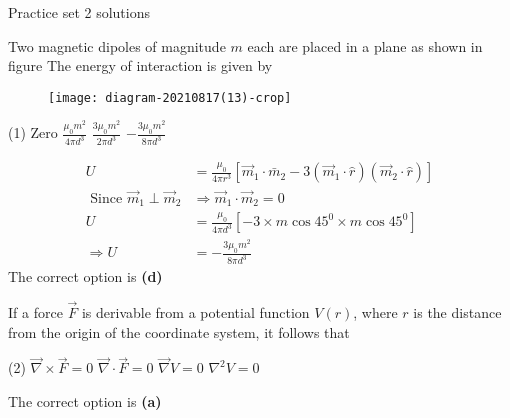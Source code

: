 \newpage
\begin{abox}
	Practice set 2 solutions
	\end{abox}
\begin{enumerate}
	\begin{minipage}{\textwidth}
		\item Two magnetic dipoles of magnitude $m$ each are placed in a plane as shown in figure The energy of interaction is given by
		\begin{figure}[H]
			\centering
			\texttt{[image: diagram-20210817(13)-crop]}
			\caption{}
			\label{}
		\end{figure}
	\end{minipage}
	\begin{tasks}(1)
		\task[\textbf{A.}] Zero
		\task[\textbf{B.}]$\frac{\mu_{0} m^{2}}{4 \pi d^{3}}$
		\task[\textbf{C.}]$\frac{3 \mu_{0} m^{2}}{2 \pi d^{3}}$
		\task[\textbf{D.}]$-\frac{3 \mu_{0} m^{2}}{8 \pi d^{3}}$
	\end{tasks}
	\begin{answer}
		\begin{align*}
		U&=\frac{\mu_{0}}{4 \pi r^{3}}\left[\vec{m}_{1} \cdot \bar{m}_{2}-3\left(\vec{m}_{1} \cdot \hat{r}\right)\left(\vec{m}_{2} \cdot \hat{r}\right)\right] \\
		\text { Since } \vec{m}_{1} \perp \vec{m}_{2} &\Rightarrow \vec{m}_{1} \cdot \vec{m}_{2}=0\\
		 U&=\frac{\mu_{0}}{4 \pi d^{3}}\left[-3 \times m \cos 45^{0} \times m \cos 45^{0}\right] \\
		\Rightarrow U&=-\frac{3 \mu_{0} m^{2}}{8 \pi d^{3}}
		\end{align*}	
		The correct option is \textbf{(d)}
	\end{answer}
	\begin{minipage}{\textwidth}
		\item If a force $\vec{F}$ is derivable from a potential function $V(r)$, where $r$ is the distance from the origin of the coordinate system, it follows that
	\end{minipage}
	\begin{tasks}(2)
		\task[\textbf{A.}]$\vec{\nabla} \times \vec{F}=0$
		\task[\textbf{B.}]$\vec{\nabla} \cdot \vec{F}=0$
		\task[\textbf{C.}]$\vec{\nabla} V=0$
		\task[\textbf{D.}]$\nabla^{2} V=0$
	\end{tasks}
	\begin{answer}
		The correct option is \textbf{(a)}	
	\end{answer}

\end{enumerate}
